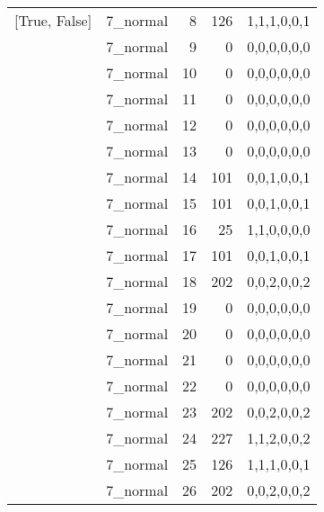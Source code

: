 \begin{tabular}{llrrl}
 [True, False]   & 7\_normal            &             8 &                   126 & 1,1,1,0,0,1   \\
 [True, False]   & 7\_normal            &             9 &                     0 & 0,0,0,0,0,0   \\
 [True, False]   & 7\_normal            &            10 &                     0 & 0,0,0,0,0,0   \\
 [True, False]   & 7\_normal            &            11 &                     0 & 0,0,0,0,0,0   \\
 [True, False]   & 7\_normal            &            12 &                     0 & 0,0,0,0,0,0   \\
 [True, False]   & 7\_normal            &            13 &                     0 & 0,0,0,0,0,0   \\
 [True, False]   & 7\_normal            &            14 &                   101 & 0,0,1,0,0,1   \\
 [True, False]   & 7\_normal            &            15 &                   101 & 0,0,1,0,0,1   \\
 [True, False]   & 7\_normal            &            16 &                    25 & 1,1,0,0,0,0   \\
 [True, False]   & 7\_normal            &            17 &                   101 & 0,0,1,0,0,1   \\
 [True, False]   & 7\_normal            &            18 &                   202 & 0,0,2,0,0,2   \\
 [True, False]   & 7\_normal            &            19 &                     0 & 0,0,0,0,0,0   \\
 [True, False]   & 7\_normal            &            20 &                     0 & 0,0,0,0,0,0   \\
 [True, False]   & 7\_normal            &            21 &                     0 & 0,0,0,0,0,0   \\
 [True, False]   & 7\_normal            &            22 &                     0 & 0,0,0,0,0,0   \\
 [True, False]   & 7\_normal            &            23 &                   202 & 0,0,2,0,0,2   \\
 [True, False]   & 7\_normal            &            24 &                   227 & 1,1,2,0,0,2   \\
 [True, False]   & 7\_normal            &            25 &                   126 & 1,1,1,0,0,1   \\
 [True, False]   & 7\_normal            &            26 &                   202 & 0,0,2,0,0,2   \\

\end{tabular}
